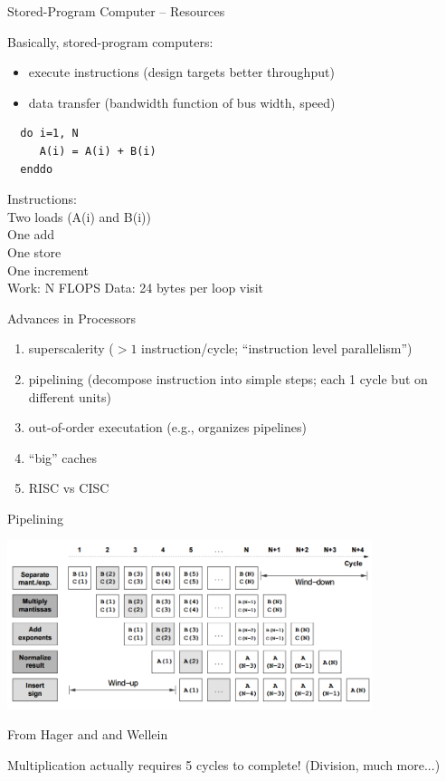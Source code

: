 \documentclass[10pt]{beamer}
\begin{document}
\begin{frame}[fragile]{Stored-Program Computer -- Resources}

Basically, stored-program computers:
\begin{itemize}
 \item  execute instructions (design targets better throughput)
 \item  data transfer (bandwidth function of bus width, speed)
\end{itemize}

\begin{lstlisting}
  do i=1, N
     A(i) = A(i) + B(i)  
  enddo
\end{lstlisting}
\vfill 
Instructions:\\
Two loads (A(i) and B(i))\\
One add\\
One store\\
One increment\\
\vfill 
Work: N FLOPS
\vfill 
Data: 24 bytes per loop visit
\end{frame}

\begin{frame}{Advances in Processors}
 
 \begin{enumerate}
  \item superscalerity ($>1$ instruction/cycle; ``instruction level parallelism'')
  \item pipelining (decompose instruction into simple steps; each 1 cycle but on different units)
  \item out-of-order executation (e.g., organizes pipelines)
  \item ``big'' caches 
  \item RISC vs CISC 
 \end{enumerate}
 
\end{frame}

\begin{frame}{Pipelining}

\includegraphics[width=0.8\textwidth]{fp_multiplication_pipeline.png}

{\tiny From Hager and and Wellein}
\vfill

Multiplication actually requires 5 cycles to complete!
(Division, much more...)

\end{frame}
\end{document}

